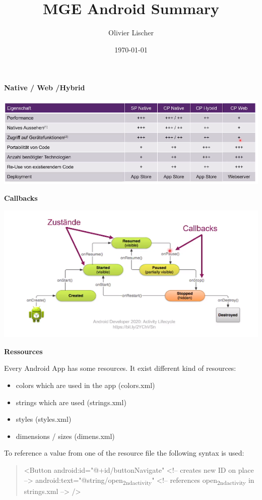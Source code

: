 \documentclass[11pt,twoside,landscape]{article}
\author{Olivier Lischer}
\date{\today}
\title{MGE Android Summary}
\begin{document}
\begin{multicols}{3}

\textbf{Native / Web /Hybrid}

\begin{center}
\includegraphics[width=.9\linewidth]{img/vor-nachteile-native-web-hybrid.png}
\end{center}


\textbf{Callbacks}

\begin{center}
\includegraphics[width=.9\linewidth]{img/android_callbacks.png}
\end{center}


\textbf{Ressources}

Every Android App has some resources. It exist different kind of resources:
\begin{itemize}
\item colors which are used in the app (colors.xml)
\item strings which are used (strings.xml)
\item styles (styles.xml)
\item dimensions / sizes (dimens.xml)
\end{itemize}


To reference a value from one of the resource file the following syntax is used:
\begin{quote}
<Button
    android:id="@+id/buttonNavigate" <!-- creates new ID on place -->
    android:text="@string/open\textsubscript{2nd}\textsubscript{activity}" <!-- references open\textsubscript{2nd}\textsubscript{activity} in strings.xml --> />
\end{quote}



\end{multicols}
\end{document}
